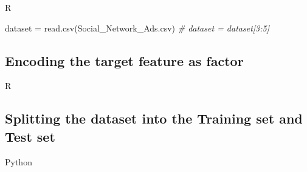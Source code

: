 \documentclass[
]{book}
\newenvironment{Shaded}{\begin{snugshade}}{\end{snugshade}}
\newcommand{\AttributeTok}[1]{\textcolor[rgb]{0.77,0.63,0.00}{#1}}
\newcommand{\CommentTok}[1]{\textcolor[rgb]{0.56,0.35,0.01}{\textit{#1}}}
\newcommand{\DecValTok}[1]{\textcolor[rgb]{0.00,0.00,0.81}{#1}}
\newcommand{\FunctionTok}[1]{\textcolor[rgb]{0.00,0.00,0.00}{#1}}
\newcommand{\NormalTok}[1]{#1}
\newcommand{\OtherTok}[1]{\textcolor[rgb]{0.56,0.35,0.01}{#1}}
\newcommand{\SpecialCharTok}[1]{\textcolor[rgb]{0.00,0.00,0.00}{#1}}
\newcommand{\StringTok}[1]{\textcolor[rgb]{0.31,0.60,0.02}{#1}}
\theoremstyle{definition}
\theoremstyle{definition}
\theoremstyle{definition}
\theoremstyle{definition}
\theoremstyle{remark}
\begin{document}
R

\begin{Shaded}
\begin{Highlighting}[]
\NormalTok{dataset }\OtherTok{=} \FunctionTok{read.csv}\NormalTok{(}\StringTok{\textquotesingle{}Social\_Network\_Ads.csv\textquotesingle{}}\NormalTok{)}
\CommentTok{\# dataset = dataset[3:5]}
\end{Highlighting}
\end{Shaded}

\hypertarget{encoding-the-target-feature-as-factor-6}{%
\subsection{Encoding the target feature as factor}\label{encoding-the-target-feature-as-factor-6}}

R

\begin{Shaded}
\end{Shaded}

\hypertarget{splitting-the-dataset-into-the-training-set-and-test-set-9}{%
\subsection{Splitting the dataset into the Training set and Test set}\label{splitting-the-dataset-into-the-training-set-and-test-set-9}}

Python
\end{document}
